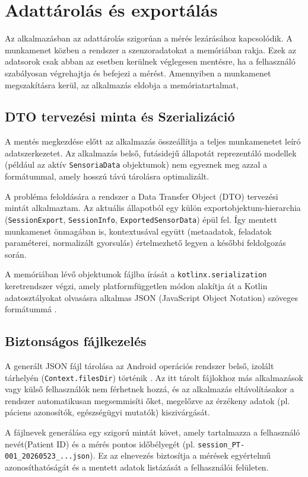 \section{Adattárolás és exportálás}

Az alkalmazásban az adattárolás szigorúan a mérés lezárásához kapcsolódik. A munkamenet közben a
rendszer a szenzoradatokat a memóriában rakja. Ezek az adatsorok csak abban az esetben kerülnek
véglegesen mentésre, ha a felhasználó szabályosan végrehajtja és befejezi a mérést. Amennyiben a
munkamenet megszakításra kerül, az alkalmazás eldobja a memóriatartalmat,

\subsection{DTO tervezési minta és Szerializáció}

A mentés megkezdése előtt az alkalmazás összeállítja a teljes munkamenetet leíró adatszerkezetet.
Az alkalmazás belső, futásidejű állapotát
reprezentáló modellek (például az aktív \texttt{SensoriaData} objektumok) nem egyeznek meg azzal
a formátummal, amely hosszú távú tárolásra optimalizált.

A probléma feloldására a rendszer a Data Transfer Object (DTO) tervezési mintát alkalmaztam.
Az aktuális állapotból egy külön exportobjektum-hierarchia (\texttt{SessionExport}, \texttt{SessionInfo},
\texttt{ExportedSensorData}) épül fel. Így mentett munkamenet önmagában is, kontextusával együtt
(metaadatok, feladatok paraméterei, normalizált gyorsulás) értelmezhető legyen a későbbi feldolgozás során.

A memóriában lévő objektumok fájlba írását a \texttt{kotlinx.serialization} keretrendszer végzi,
amely platformfüggetlen módon alakítja át a Kotlin adatosztályokat olvasásra
alkalmas  JSON (JavaScript Object Notation) szöveges formátummá \cite{kotlinserialization}.

\subsection{Biztonságos fájlkezelés}

A generált JSON fájl tárolása az Android operációs rendszer belső, izolált tárhelyén
(\texttt{Context.filesDir}) történik \cite{androidstorage}. Az itt tárolt fájlokhoz más alkalmazások
vagy külső felhasználók nem férhetnek hozzá, és az alkalmazás eltávolításakor a rendszer
automatikusan megsemmisíti őket, megelőzve az érzékeny adatok (pl. páciens azonosítók, egészségügyi mutatók)
kiszivárgását.

A fájlnevek generálása egy szigorú mintát követ,
amely tartalmazza a felhasználó nevét(Patient ID) és a mérés pontos időbélyegét
(pl. \texttt{session\_PT-001\_20260523\_...json}). Ez az elnevezés biztosítja a mérések
egyértelmű azonosíthatóságát és a mentett adatok listázását a
felhasználói felületen.

